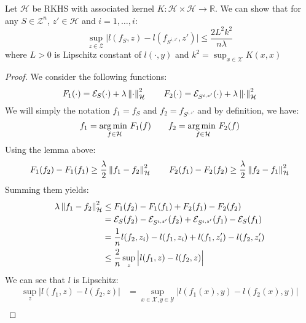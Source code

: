 \begin{theorem}
    \label{thm:stability-RKHS}
    Let $\mathcal{H}$ be RKHS with associated kernel $K: \mathcal{H} \times \mathcal{H} \rightarrow \mathbb{R}$. We can show that for any $S\in\mathcal{Z}^n$, $z'\in\mathcal{H}$ and $i=1,\dots,i$:
    \begin{equation*}
        \sup_{z\in\mathcal{Z}}\Big| l(f_S, z) - l(f_{S^{i, z'}}, z') \Big| \le \frac{2L^2k^2}{n\lambda}
    \end{equation*}
    where $L>0$ is Lipschitz constant of $l(\cdot, y)$ and $k^2 = \sup_{x\in\mathcal{X}}K(x,x)$
\end{theorem}
\begin{proof}
    We consider the following functions:
    \begin{equation*}
        F_1(\cdot) = \mathcal{E}_S(\cdot) + \lambda\left\lVert\cdot\right\rVert^2_\mathcal{H} \qquad F_2(\cdot) = \mathcal{E}_{S^{i, z'}}(\cdot) + \lambda\left\lVert\cdot\right\rVert^2_\mathcal{H}
    \end{equation*}
    We will simply the notation $f_1 = f_S$ and $f_2 = f_{S^{i, z'}}$ and by definition, we have:
    \begin{equation*}
        f_1 = \underset{f\in\mathcal{H}}{\arg\min \ }F_1(f) \qquad f_2 = \underset{f\in\mathcal{H}}{\arg\min \ } F_2(f)
    \end{equation*}
    Using the lemma above:
    \begin{equation*}
        F_1(f_2) - F_1(f_1) \ge \frac{\lambda}{2}\left\lVert f_1 - f_2\right\rVert^2_\mathcal{H} \qquad F_2(f_1) - F_2(f_2)\ge \frac{\lambda}{2}\left\lVert f_2 - f_1\right\rVert^2_\mathcal{H}
    \end{equation*}
    Summing them yields:
    \begin{equation*}
    \begin{aligned}
        \lambda\left\lVert f_1-f_2\right\rVert^2_\mathcal{H} &\le F_1(f_2) - F_1(f_1) + F_2(f_1)-F_2(f_2) \\
        &=\mathcal{E}_S(f_2) - \mathcal{E}_{S^{i ,z'}}(f_2) + \mathcal{E}_{S^{i, z'}}(f_1) - \mathcal{E}_S(f_1) \\
        &= \frac{1}{n} l(f_2, z_i) - l(f_1,z_i) + l(f_1, z_i') - l(f_2, z_i') \\
        &\le\frac{2}{n}\sup_{z}\Big| l(f_1, z) - l(f_2, z) \Big|
    \end{aligned}
    \end{equation*}
    We can see that $l$ is Lipschitz:
    \begin{equation*}
    \begin{aligned}
        \sup_{z}\Big| l(f_1, z) - l(f_2, z) \Big| &= \sup_{x\in\mathcal{X}, y\in\mathcal{Y}}\Big| l(f_1(x), y) - l(f_2(x), y) \Big| \\

\end{aligned}
\end{equation*}
\end{proof}
